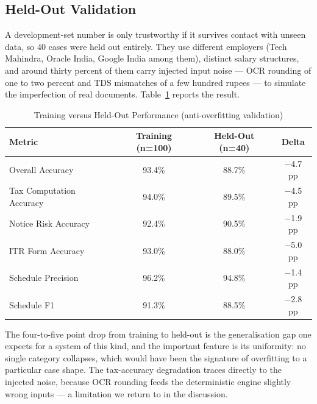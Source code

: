 \documentclass[12pt, a4paper, oneside]{report}
\begin{document}
\subsection{Held-Out Validation}
A development-set number is only trustworthy if it survives contact with unseen
data, so 40 cases were held out entirely. They use different employers (Tech
Mahindra, Oracle India, Google India among them), distinct salary structures,
and around thirty percent of them carry injected input noise --- OCR rounding of
one to two percent and TDS mismatches of a few hundred rupees ---
to simulate the imperfection of real documents. Table~\ref{tab:heldout}
reports the result.

\begin{table}[H]
\centering
\caption{Training versus Held-Out Performance (anti-overfitting validation)}
\label{tab:heldout}
\small
\begin{tabularx}{\textwidth}{|X|c|c|c|}
\hline
\textbf{Metric} & \textbf{Training (n=100)} & \textbf{Held-Out (n=40)} & \textbf{Delta} \\
\hline
Overall Accuracy & 93.4\% & 88.7\% & $-$4.7 pp \\
\hline
Tax Computation Accuracy & 94.0\% & 89.5\% & $-$4.5 pp \\
\hline
Notice Risk Accuracy & 92.4\% & 90.5\% & $-$1.9 pp \\
\hline
ITR Form Accuracy & 93.0\% & 88.0\% & $-$5.0 pp \\
\hline
Schedule Precision & 96.2\% & 94.8\% & $-$1.4 pp \\
\hline
Schedule F1 & 91.3\% & 88.5\% & $-$2.8 pp \\
\hline
\end{tabularx}
\end{table}

The four-to-five point drop from training to held-out is the generalisation gap
one expects for a system of this kind, and the important feature is its
uniformity: no single category collapses, which would have been the signature of
overfitting to a particular case shape. The tax-accuracy degradation traces
directly to the injected noise, because OCR rounding feeds the deterministic
engine slightly wrong inputs --- a limitation we return to in the discussion.
\end{document}
